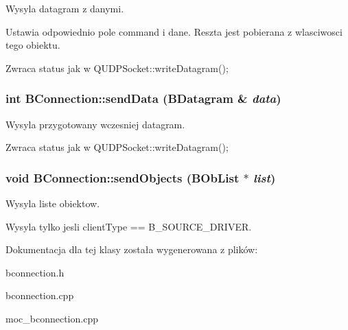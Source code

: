 Wysyla datagram z danymi. 

Ustawia odpowiednio pole command i dane. Reszta jest pobierana z wlasciwosci tego obiektu.

\begin{DoxyReturn}{Zwraca}
status jak w QUDPSocket::writeDatagram(); 
\end{DoxyReturn}
\hypertarget{class_b_connection_a53b6835b9124709e108913103049910b}{
\subsubsection[{sendData}]{\setlength{\rightskip}{0pt plus 5cm}int BConnection::sendData ({\bf BDatagram} \& {\em data})}}
\label{class_b_connection_a53b6835b9124709e108913103049910b}


Wysyla przygotowany wczesniej datagram. 

\begin{DoxyReturn}{Zwraca}
status jak w QUDPSocket::writeDatagram(); 
\end{DoxyReturn}
\hypertarget{class_b_connection_a348456770c1f73c004ea60d03fca1a41}{
\subsubsection[{sendObjects}]{\setlength{\rightskip}{0pt plus 5cm}void BConnection::sendObjects ({\bf BObList} $\ast$ {\em list})}}
\label{class_b_connection_a348456770c1f73c004ea60d03fca1a41}


Wysyla liste obiektow. 

Wysyla tylko jesli clientType == B\_\-SOURCE\_\-DRIVER. 

Dokumentacja dla tej klasy została wygenerowana z plików:\begin{DoxyCompactItemize}
\item 
bconnection.h\item 
bconnection.cpp\item 
moc\_\-bconnection.cpp\end{DoxyCompactItemize}
